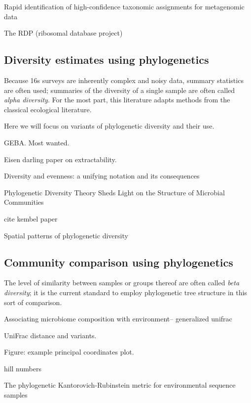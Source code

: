 \documentclass{amsart}
\begin{document}
\cite{macdonald2012rapid}
Rapid identification of high-confidence taxonomic assignments for metagenomic data

\cite{maidak1997rdp}
The RDP (ribosomal database project)


\subsection{Diversity estimates using phylogenetics}

Because 16s surveys are inherently complex and noisy data, summary statistics are often used; summaries of the diversity of a single sample are often called \emph{alpha diversity}.
For the most part, this literature adapts methods from the classical ecological literature.

Here we will focus on variants of phylogenetic diversity and their use.

GEBA. Most wanted.

Eisen darling paper on extractability.

\cite{hill1973diversity}
Diversity and evenness: a unifying notation and its consequences


\cite{odwyer2012phylogenetic}
Phylogenetic Diversity Theory Sheds Light on the Structure of Microbial Communities

cite kembel paper

\cite{morlon2011spatial}
Spatial patterns of phylogenetic diversity


\subsection{Community comparison using phylogenetics}

The level of similarity between samples or groups thereof are often called \emph{beta diversity}; it is the current standard to employ phylogenetic tree structure in this sort of comparison.

\cite{chen2012associating}
Associating microbiome composition with environment-- generalized unifrac

UniFrac distance and variants.
\cite{LozuponeKnightUniFrac05}
\cite{LozuponeEaWeightedUnifrac07}

Figure: example principal coordinates plot.

\cite{BikEaMicrobiotaStomach06}

hill numbers
\cite{chao2010phylogenetic}

\cite{evans2012phylogenetic}
The phylogenetic Kantorovich-Rubinstein metric for environmental sequence samples
\end{document}
